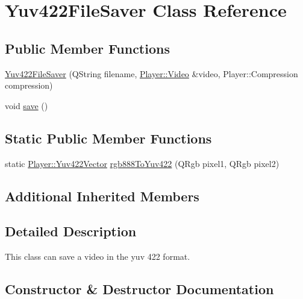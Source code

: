 \hypertarget{classPlayer_1_1Yuv422FileSaver}{}\section{Yuv422\+File\+Saver Class Reference}
\label{classPlayer_1_1Yuv422FileSaver}
\subsection*{Public Member Functions}
\begin{DoxyCompactItemize}
\item 
\hyperlink{classPlayer_1_1Yuv422FileSaver_a81ab39e07a9df3a5d56011c604729376}{Yuv422\+File\+Saver} (Q\+String filename, \hyperlink{classPlayer_1_1Video}{Player\+::\+Video} \&video, Player\+::\+Compression compression)
\item 
void \hyperlink{classPlayer_1_1Yuv422FileSaver_aae2c382151ef7c9aa913361172b30db6}{save} ()
\end{DoxyCompactItemize}
\subsection*{Static Public Member Functions}
\begin{DoxyCompactItemize}
\item 
static \hyperlink{classPlayer_1_1Yuv422Vector}{Player\+::\+Yuv422\+Vector} \hyperlink{classPlayer_1_1Yuv422FileSaver_a0b1f3df4442926b26934f247c373c54b}{rgb888\+To\+Yuv422} (Q\+Rgb pixel1, Q\+Rgb pixel2)
\end{DoxyCompactItemize}
\subsection*{Additional Inherited Members}


\subsection{Detailed Description}
This class can save a video in the yuv 422 format. 

\subsection{Constructor \& Destructor Documentation}
\hypertarget{classPlayer_1_1Yuv422FileSaver_a81ab39e07a9df3a5d56011c604729376}{}
